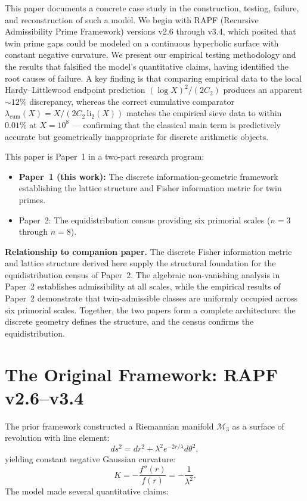 \documentclass[11pt]{article}
\begin{document}
This paper documents a concrete case study in the construction, testing, failure, and reconstruction of such a model. We begin with RAPF (Recursive Admissibility Prime Framework) versions v2.6 through v3.4, which posited that twin prime gaps could be modeled on a continuous hyperbolic surface with constant negative curvature. We present our empirical testing methodology and the results that falsified the model's quantitative claims, having identified the root causes of failure. A key finding is that comparing empirical data to the local Hardy--Littlewood endpoint prediction $(\log X)^2/(2C_2)$ produces an apparent $\sim 12\%$ discrepancy, whereas the correct cumulative comparator $\lambda_{\mathrm{cum}}(X) = X/(2C_2\,\mathrm{li}_2(X))$ matches the empirical sieve data to within $0.01\%$ at $X = 10^8$ --- confirming that the classical main term is predictively accurate but geometrically inappropriate for discrete arithmetic objects.

This paper is Paper~1 in a two-part research program:
\begin{itemize}
  \item \textbf{Paper~1 (this work):} The discrete information-geometric framework establishing the lattice structure and Fisher information metric for twin primes.
  \item Paper~2: The equidistribution census providing six primorial scales ($n=3$ through $n=8$).
\end{itemize}

\noindent\textbf{Relationship to companion paper.} The discrete Fisher information metric and lattice structure derived here supply the structural foundation for the equidistribution census of Paper~2. The algebraic non-vanishing analysis in Paper~2 establishes admissibility at all scales, while the empirical results of Paper~2 demonstrate that twin-admissible classes are uniformly occupied across six primorial scales. Together, the two papers form a complete architecture: the discrete geometry defines the structure, and the census confirms the equidistribution.

\section{The Original Framework: RAPF v2.6--v3.4}
The prior framework constructed a Riemannian manifold $\mathcal{M}_3$ as a surface of revolution with line element:
\begin{equation}
    ds^2 = dr^2 + \lambda^2 e^{-2r/\lambda} d\theta^2,
\end{equation}
yielding constant negative Gaussian curvature:
\begin{equation}
    K = -\frac{f''(r)}{f(r)} = -\frac{1}{\lambda^2}.
\end{equation}
The model made several quantitative claims:
\end{document}
